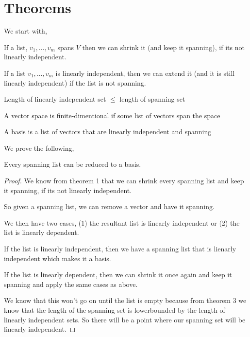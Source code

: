 \chapter*{Theorems}
We start with, 

\begin{theorem}
If a list, $v_1, \dots, v_m$ spans $V$ then we can shrink it (and keep it spanning), if its not linearly independent.
\end{theorem}

\begin{theorem}
    If a list $v_1, \dots, v_m$ is linearly independent, then we can extend it (and it is still linearly independent) if the list is not spanning.
\end{theorem}


\begin{theorem}
    Length of linearly independent set $\leq$ length of spanning set
\end{theorem}

\begin{definition}
    A vector space is finite-dimentional if some list of vectors span the space
\end{definition}

\begin{definition}
    A basis is a list of vectors that are linearly independent and spanning
\end{definition}


We prove the following, 

\begin{prop}
    Every spanning list can be reduced to a basis.

\end{prop}

    \begin{proof}
        We know from theorem 1 that we can shrink every spanning list and keep it spanning, if its not linearly independent. 

        So given a spanning list, we can remove a vector and have it spanning. 

        We then have two cases, (1) the resultant list is linearly independent or (2) the list is linearly dependent.

        If the list is linearly independent, then we have a spanning list that is lienarly independent which makes it a basis.

        If the list is linearly dependent, then we can shrink it once again and keep it spanning and apply the same cases as above.

        We know that this won't go on until the list is empty because from theorem 3 we know that the length of the spanning set is lowerbounded by the length of linearly independent sets. So there will be a point where our spanning set will be linearly independent. 
    \end{proof}


